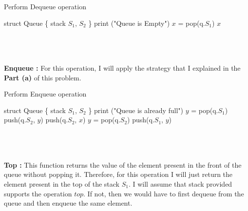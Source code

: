 \documentclass{article}
\begin{document}
{{        \colorbox[gray]{0.95}{
        \begin{algorithm2e}[H] 
        \caption{Perform Dequeue operation}
            \DontPrintSemicolon
            struct Queue \{ stack $S_1$, $S_2$ \}\;
             {
                 {
                    print ("Queue is Empty") \;
                    \KwRet
                }
                $x$ = pop(q.$S_1$) \;
                \KwRet $x$
            }
        \end{algorithm2e}
        }
        \\ \\ \\
        \textbf{Enqueue :} For this operation, I will apply the strategy that I explained in the \textbf{Part (a)} of this problem. \newline \\
        \colorbox[gray]{0.95}{
        \begin{algorithm2e}[H] 
        \caption{Perform Enqueue operation}
            \DontPrintSemicolon
            struct Queue \{ stack $S_1$, $S_2$ \}\;
             {
                {
                    print ("Queue is already full")\;
                    \KwRet
                }
                {
                    $y$ = pop(q.$S_1$)\;
                    push(q.$S_2$, $y$)\;
                }
                push(q.$S_2$, $x$)\;
                {
                    $y$ = pop(q.$S_2$)\;
                    push(q.$S_1$, $y$)\; 
                }
                \KwRet
            }
        \end{algorithm2e}
        }
         \\ \\ \\
         \textbf{Top :} This function returns the value of the element present in the front of the queue without popping it. Therefore, for this operation I will just return the element present in the top of the stack $S_1$. I will assume that stack provided supports the operation $top$. If not, then we would have to first dequeue from the queue and then enqueue the same element. \newline \\
}}
\end{document}
